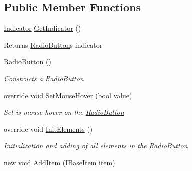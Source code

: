 \subsection*{Public Member Functions}
\begin{DoxyCompactItemize}
\item 
\mbox{\label{class_space_v_i_l_1_1_radio_button_a93706d17aa441ef94d3df1a2e9cfa803}} 
\mbox{\hyperlink{class_space_v_i_l_1_1_indicator}{Indicator}} \mbox{\hyperlink{class_space_v_i_l_1_1_radio_button_a93706d17aa441ef94d3df1a2e9cfa803}{Get\+Indicator}} ()
\begin{DoxyCompactList}\small\item\em \begin{DoxyReturn}{Returns}
\mbox{\hyperlink{class_space_v_i_l_1_1_radio_button}{Radio\+Button}}\textquotesingle{}s indicator 
\end{DoxyReturn}
\end{DoxyCompactList}\item 
\mbox{\hyperlink{class_space_v_i_l_1_1_radio_button_af9c9ea2e77f10c292aa4337447d4c070}{Radio\+Button}} ()
\begin{DoxyCompactList}\small\item\em Constructs a \mbox{\hyperlink{class_space_v_i_l_1_1_radio_button}{Radio\+Button}} \end{DoxyCompactList}\item 
override void \mbox{\hyperlink{class_space_v_i_l_1_1_radio_button_a5f7fdd3aa50cb94b6ee28e364a058acb}{Set\+Mouse\+Hover}} (bool value)
\begin{DoxyCompactList}\small\item\em Set is mouse hover on the \mbox{\hyperlink{class_space_v_i_l_1_1_radio_button}{Radio\+Button}} \end{DoxyCompactList}\item 
override void \mbox{\hyperlink{class_space_v_i_l_1_1_radio_button_a2f31e5a88432a2bff6a9a9608da0d93f}{Init\+Elements}} ()
\begin{DoxyCompactList}\small\item\em Initialization and adding of all elements in the \mbox{\hyperlink{class_space_v_i_l_1_1_radio_button}{Radio\+Button}} \end{DoxyCompactList}\item 
new void \mbox{\hyperlink{class_space_v_i_l_1_1_radio_button_a43667256c2474219e4772d2dbb112367}{Add\+Item}} (\mbox{\hyperlink{interface_space_v_i_l_1_1_core_1_1_i_base_item}{I\+Base\+Item}} item)

\end{DoxyCompactItemize}
